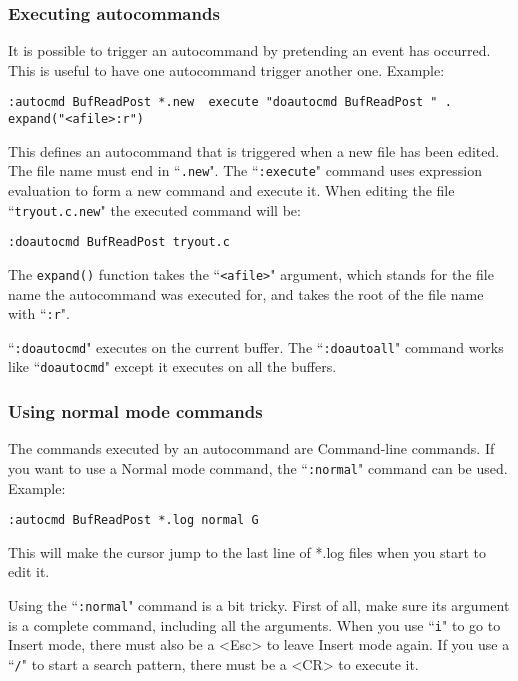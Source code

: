 \subsubsection{Executing autocommands}
It is possible to trigger an autocommand by pretending an event has occurred.
This is useful to have one autocommand trigger another one.
Example:

\begin{Verbatim}[samepage=true]
 :autocmd BufReadPost *.new  execute "doautocmd BufReadPost " . expand("<afile>:r")
\end{Verbatim}

This defines an autocommand that is triggered when a new file has been edited.
The file name must end in ``\texttt{.new}".
The ``\texttt{:execute}" command uses expression evaluation to form a new command and execute it.
When editing the file ``\texttt{tryout.c.new}" the executed command will be:

\begin{Verbatim}[samepage=true]
 :doautocmd BufReadPost tryout.c
\end{Verbatim}

The \texttt{expand()} function takes the ``\texttt{<afile>}" argument, which stands for the file name the autocommand was executed for, and takes the root of the file name with ``\texttt{:r}".

``\texttt{:doautocmd}" executes on the current buffer.
The ``\texttt{:doautoall}" command works like ``\texttt{doautocmd}" except it executes on all the buffers.

\subsubsection{Using normal mode commands}
The commands executed by an autocommand are Command-line commands.
If you want to use a Normal mode command, the ``\texttt{:normal}" command can be used.
Example:

\begin{Verbatim}[samepage=true]
 :autocmd BufReadPost *.log normal G
\end{Verbatim}

This will make the cursor jump to the last line of *.log files when you start to edit it.

Using the ``\texttt{:normal}" command is a bit tricky.
First of all, make sure its argument is a complete command, including all the arguments.
When you use ``\texttt{i}" to go to Insert mode, there must also be a <Esc> to leave Insert mode again.
If you use a ``\texttt{/}" to start a search pattern, there must be a <CR> to execute it.

